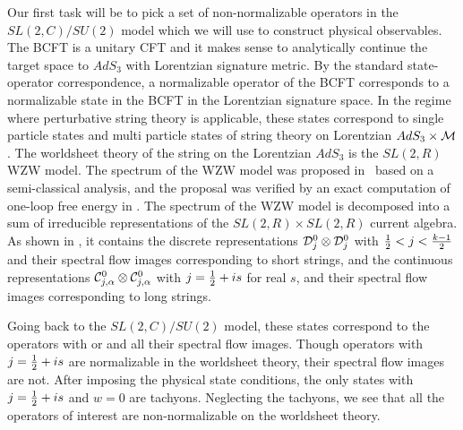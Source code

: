 Our first task will be to pick a set of non-normalizable operators
in the $SL(2,C)/SU(2)$ model which we will use to
construct physical observables. The BCFT is a unitary CFT
and it makes sense to analytically continue the target space
to $AdS_3$ with Lorentzian signature metric. By the standard
state-operator correspondence, a normalizable operator of the
BCFT corresponds to a normalizable state in the BCFT in
the Lorentzian signature space. In the regime where perturbative
string theory is applicable, these states correspond to
single particle states and multi particle states of
string theory on  Lorentzian $AdS_3 \times {\cal M}$.
The worldsheet theory of the string on the Lorentzian $AdS_3$
is the $SL(2,R)$ WZW model. The spectrum of the WZW model
was proposed in \first\ based on a semi-classical
analysis, and the proposal was verified by an exact computation
of one-loop free energy in \second. The spectrum of
the WZW model is decomposed into a sum of irreducible
representations of the $SL(2,R) \times SL(2,R)$ current
algebra. As shown in \hilbertspace,
it contains the discrete representations ${\cal D}_j^0 \otimes
{\cal D}_j^0$ with ${1\over 2} < j < {k-1\over 2}$ and their spectral
flow images corresponding to short strings, and
the continuous representations ${\cal C}_{j,\alpha}^0
\otimes {\cal C}_{j,\alpha}^0$ with
$j = {1\over 2} + i s$ for real $s$, and their
spectral flow images corresponding to long
strings.

Going back to the $SL(2,C)/SU(2)$ model,
these states correspond to the operators with
\eqn{}
or
\eqn{}
and all their spectral flow images. Though operators with
$j={1 \over 2} +is$ are normalizable in the worldsheet theory,
 their spectral flow images are not.
After imposing the physical state conditions, the only
states with $j={1 \over 2} + is$ and $w=0$ are tachyons. Neglecting
the tachyons, we see that all the operators of interest are
non-normalizable on the worldsheet theory.

